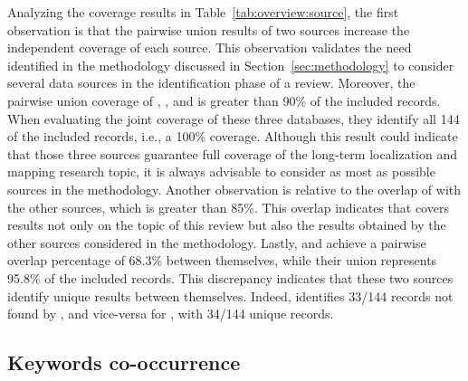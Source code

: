 Analyzing the coverage results in Table~\ref{tab:overview:source}, the first observation is that the pairwise union results of two sources increase the independent coverage of each source. This observation validates the need identified in the methodology discussed in Section~\ref{sec:methodology} to consider several data sources in the identification phase of a review. Moreover, the pairwise union coverage of , , and  is greater than 90\% of the included records. When evaluating the joint coverage of these three databases, they identify all 144 of the included records, i.e., a 100\% coverage. Although this result could indicate that those three sources guarantee full coverage of the long-term localization and mapping research topic, it is always advisable to consider as most as possible sources in the methodology. Another observation is relative to the overlap of  with the other sources, which is greater than 85\%. This overlap indicates that  covers results not only on the topic of this review but also the results obtained by the other sources considered in the methodology. Lastly,  and  achieve a pairwise overlap percentage of 68.3\% between themselves, while their union represents 95.8\% of the included records. This discrepancy indicates that these two sources identify unique results between themselves. Indeed,  identifies 33/144 records not found by , and vice-versa for , with 34/144 unique records.

\subsection{Keywords co-occurrence}
\label{sec:overview:kw}

